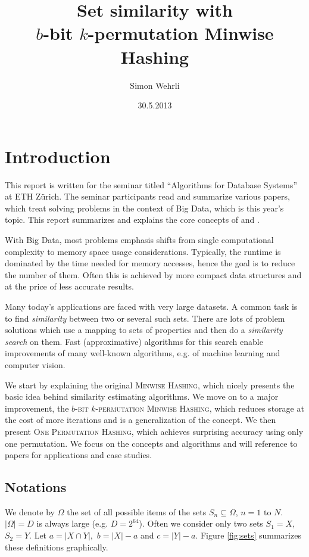 \documentclass[a4paper]{article}
\author{Simon Wehrli}
\date{30.5.2013}
\title{Set similarity with\\ $b$-bit $k$-permutation Minwise Hashing}
\begin{document}
 
\maketitle

\section{Introduction}
This report is written for the seminar titled ``Algorithms for Database Systems'' at ETH Z\"{u}rich. The seminar participants read and summarize various papers, which treat solving problems in the context of Big Data, which is this year's topic. This report summarizes and explains the core concepts of \citep{LiK11} and \citep{LiOwZhang12}.

With Big Data, most problems emphasis shifts from single computational complexity to memory space usage considerations. Typically, the runtime is dominated by the time needed for memory accesses, hence the goal is to reduce the number of them. Often this is achieved by more compact data structures and at the price of less accurate results.

Many today's applications are faced with very large datasets. A common task is to find \emph{similarity} between two or several such sets. There are lots of problem solutions which use a mapping to sets of properties and then do a \emph{similarity search} on them. Fast (approximative) algorithms for this search enable improvements of many well-known algorithms, e.g. of machine learning and computer vision.

We start by explaining the original \textsc{Minwise Hashing}, which nicely presents the basic idea behind similarity estimating algorithms. We move on to a major improvement, the \textsc{$b$-bit $k$-permutation Minwise Hashing}, which reduces storage at the cost of more iterations and is a generalization of the concept. We then present \textsc{One Permutation Hashing}, which achieves surprising accuracy using only one permutation. We focus on the concepts and algorithms and will reference to papers for applications and case studies.


\subsection{Notations}

We denote by $\Omega$ the set of all possible items of the sets $S_n \subseteq \Omega$, $n = 1 \text{ to } N$. $\left| \Omega \right| = D$ is always large (e.g. $D=2^{64}$). Often we consider only two sets $S_1 = X$, $S_2 = Y$. Let $a=|X \cap Y|,$ $b=|X|-a$ and $c=|Y|-a$. Figure \vref{fig:sets} summarizes these definitions graphically.
\end{document}
